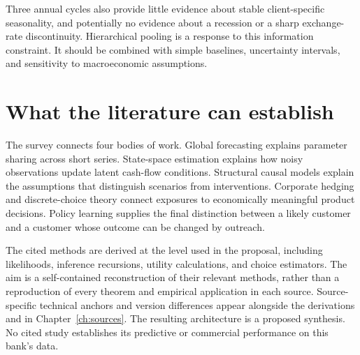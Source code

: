 Three annual cycles also provide little evidence about stable client-specific seasonality, and potentially no evidence about a recession or a sharp exchange-rate discontinuity. Hierarchical pooling is a response to this information constraint. It should be combined with simple baselines, uncertainty intervals, and sensitivity to macroeconomic assumptions.

\section{What the literature can establish}
The survey connects four bodies of work. Global forecasting explains parameter sharing across short series. State-space estimation explains how noisy observations update latent cash-flow conditions. Structural causal models explain the assumptions that distinguish scenarios from interventions. Corporate hedging and discrete-choice theory connect exposures to economically meaningful product decisions. Policy learning supplies the final distinction between a likely customer and a customer whose outcome can be changed by outreach.

The cited methods are derived at the level used in the proposal, including likelihoods, inference recursions, utility calculations, and choice estimators. The aim is a self-contained reconstruction of their relevant methods, rather than a reproduction of every theorem and empirical application in each source. Source-specific technical anchors and version differences appear alongside the derivations and in Chapter~\ref{ch:sources}. The resulting architecture is a proposed synthesis. No cited study establishes its predictive or commercial performance on this bank's data.

